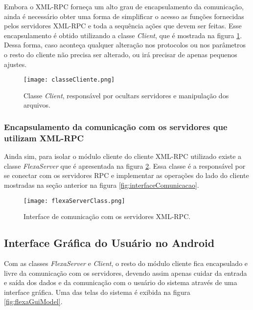         Embora o XML-RPC forneça um alto grau de encapsulamento da comunicação, ainda é necessário obter uma forma de simplificar o acesso as funções fornecidas pelos servidores XML-RPC e toda a sequência ações que devem ser feitas. Esse encapsulamento é obtido utilizando a classe \textit{Client}, que é mostrada na figura \ref{fig:clientClass}. Dessa forma, caso aconteça qualquer alteração nos protocolos ou nos parâmetros o resto do cliente não precisa ser alterado, ou irá precisar de apenas pequenos ajustes.
        
        \begin{figure}[!ht]
        \centering
        \texttt{[image: classeCliente.png]}
        \caption{Classe \textit{Client}, responsável por ocultars servidores e manipulação dos arquivos.}
        \label{fig:clientClass}
        \end{figure}
        
        
         \subsubsection{Encapsulamento da comunicação com os servidores que utilizam XML-RPC}
         
        Ainda sim, para isolar o módulo cliente do cliente XML-RPC utilizado existe a classe \textit{FlexaServer} que é apresentada na figura \ref{fig:flexaServer}. Essa classe é a responsável por se conectar com os servidores RPC e implementar as operações  do lado do cliente mostradas na seção anterior na figura \ref{fig:interfaceComunicacao}.
        
        \begin{figure}[!ht]
        \centering
        \texttt{[image: flexaServerClass.png]}
        \caption{Interface de comunicação com os servidores XML-RPC.}
        \label{fig:flexaServer}
        \end{figure}
        
        
        \subsection{Interface Gráfica do Usuário no Android}
        
        Com as classes \textit{FlexaServer} e \textit{Client}, o resto do módulo cliente fica encapsulado e livre da comunicação com os servidores, devendo assim apenas cuidar da entrada e saída dos dados e da comunicação com o usuário do sistema através de uma interface gráfica. Uma das telas do sistema é exibida na figura \ref{fig:flexaGuiModel}.
        
